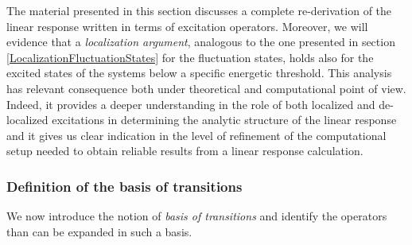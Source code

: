 \documentclass[a4paper]{article}
\begin{document}
The material presented in this section discusses a complete re-derivation of the linear response written in terms of excitation operators. Moreover, we will evidence that a \emph{localization 
argument}, analogous to the one presented in section \ref{LocalizationFluctuationStates} for the fluctuation states, holds also for the excited states of the systems below a specific energetic
threshold. This analysis has relevant consequence both under theoretical and computational point of view. Indeed, it provides a deeper understanding in the role of both localized and de-localized 
excitations in determining the analytic structure of the linear response and it gives us clear indication in the level of refinement of the computational setup needed to obtain reliable results 
from a linear response calculation. 

\subsubsection{Definition of the basis of transitions}

We now introduce the notion of \emph{basis of transitions} and identify the operators than can be expanded in such a basis. 
\end{document}
